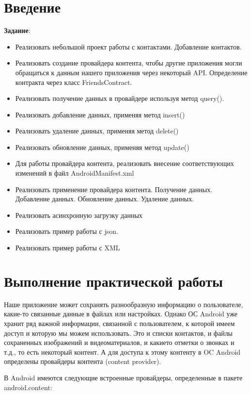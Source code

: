 \graphicspath{{./fourteenth/img}}

\section*{\LARGE{Введение}}

\textbf{Задание}:
\begin{itemize}
	\item Реализовать небольшой проект работы с контактами. Добавление
		контактов.
	\item Реализовать создание провайдера контента, чтобы другие
		приложения могли обращаться к данным нашего приложения через
		некоторый API. Определение контракта через класс FriendsContract.
	\item Реализовать получение данных в провайдере используя метод
		query().
	\item Реализовать добавление данных, применяя метод insert()
	\item Реализовать удаление данных, применяя метод delete()
	\item Реализовать обновление данных, применяя метод update()
	\item Для работы провайдера контента, реализовать внесение
		соответствующих изменений в файл AndroidManifest.xml
	\item Реализовать применение провайдера контента. Получение данных.
		Добавление данных. Обновление данных. Удаление данных.
	\item Реализовать асинхронную загрузку данных
	\item Реализовать пример работы с json.
	\item Реализовать пример работы с XML
\end{itemize}

\clearpage

\section*{\LARGE{Выполнение практической работы}}
Наше приложение может сохранять разнообразную информацию о
пользователе, какие-то связанные данные в файлах или настройках. Однако
ОС Android уже хранит ряд важной информации, связанной с пользователем,
к которой имеем доступ и которую мы можем использовать. Это и списки
контактов, и файлы сохраненных изображений и видеоматериалов, и какието отметки о звонках и т.д., то есть некоторый контент. А для доступа к
этому контенту в OC Android определены провайдеры контента (content
provider).\par
В Android имеются следующие встроенные провайдеры, определенные в
пакете android.content:

